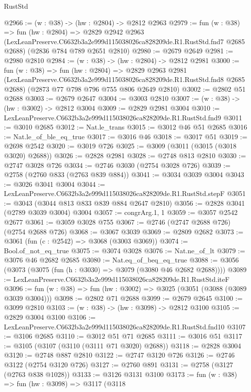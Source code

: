 \begin{lexlean}{RustStd}
\begin{coremodule}
@2966 := (w : @38) -> (hw : @2804) -> @2812 @2963
@2979 := fun (w : @38) =>
  fun (hw : @2804) =>
  @2829
    @2942
    @2963
    (LexLeanPreserve.C6632b3a2e999d115038026ca828209de.R1.RustStd.fnd7 @2685 @2688)
    (@2836 @784 @789 @2651 @2810)
@2980 := @2679 @2649
@2981 := @2980 @2810
@2984 := (w : @38) -> (hw : @2804) -> @2812 @2981
@3000 := fun (w : @38) =>
  fun (hw : @2804) =>
  @2829
    @2963
    @2981
    (LexLeanPreserve.C6632b3a2e999d115038026ca828209de.R1.RustStd.fnd8 @2685 @2688)
    (@2873 @77 @798 @796 @755 @806 @2649 @2810)
@3002 := @2802 @51 @2688
@3003 := @2679 @2647
@3004 := @3003 @2810
@3007 := (w : @38) -> (hw : @3002) -> @2812 @3004
@3009 := @2829 @2981 @3004
@3010 := LexLeanPreserve.C6632b3a2e999d115038026ca828209de.R1.RustStd.fnd9
@3011 := @3010 @2685
@3012 := Nat.le_trans
@3015 := @3012 @46 @51 @2685
@3016 := Nat.le_of_ble_eq_true
@3017 := @3016 @46
@3018 := @3017 @51
@3019 := @2698 @2542
@3020 := @3019 @726
@3025 := @3009 (@3011 (@3015 (@3018 @3020) @2688))
@3026 := @2828 @2981
@3028 := @2748 @813 @2810
@3030 := @2747 @3028 @726
@3034 := @2746 @3030 (@2754 @3028 @726)
@3039 := @2758 (@2760 @833 (@2763 @839 @884))
@3041 := @3034 @3039 @3004
@3043 := @3026 @3041 @3004
@3044 := LexLeanPreserve.C6632b3a2e999d115038026ca828209de.R1.RustStd.stepF
@3051 := @3043 (@3044 @813 @833 @839 @884 @2647 @2810)
@3056 := @2828 @3041 (@2789 @3039 @3004) @3004
@3057 := congrArg.{1, 1}
@3059 := @3057 @2542 @2677
@3061 := @3059 @3028 @755
@3067 := @2746 (@2747 @2688 @726) (@2754 @2688 @726)
@3068 := @3067 @3039
@3069 := @2809 @2682
@3073 := @3061 (fun (c : @2542) => @3068 (@3003 @3069))
@3074 := Bool.of_not_eq_true
@3075 := @3074 @3028
@3076 := Nat.ne_of_lt
@3079 := @3076 @46 @2682 @2685
@3080 := Nat.eq_of_beq_eq_true
@3088 := @3056 (@3073 (@3075 (fun (h : @3030) => @3079 (@3080 @46 @2682 @2688))))
@3089 := LexLeanPreserve.C6632b3a2e999d115038026ca828209de.R1.RustStd.iteF
@3096 := fun (w : @38) => fun (hw : @3002) => @3025 (@3051 (@3088 (@3089 @3039 @3004)))
@3098 := @2802 @71 @2688
@3099 := @2679 @2645
@3100 := @3099 @2810
@3103 := (w : @38) -> (hw : @3098) -> @2812 @3100
@3105 := @2829 @3004 @3100
@3106 := LexLeanPreserve.C6632b3a2e999d115038026ca828209de.R1.RustStd.fnd10
@3107 := @3106 @2685
@3110 := @3012 @51 @71 @2685
@3111 := @3016 @51
@3117 := @3105 (@3107 (@3110 (@3111 @71 @3020) @2688))
@3118 := @2828 @3004
@3120 := @2748 @887 @2810
@3122 := @2747 @3120 @726
@3126 := @2746 @3122 (@2754 @3120 @726)
@3127 := @2760 @891
@3131 := @2758 (@3127 (@2763 @838 @1028))
@3133 := @3126 @3131 @3100
@3173 := fun (w : @38) =>
  fun (hw : @3098) =>
  @3117
    (@3118

\end{coremodule}
\end{lexlean}
